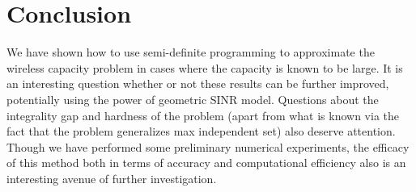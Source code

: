 \documentclass[11pt]{amsart}
\begin{document}
\section{Conclusion}
We have shown how to use semi-definite programming to approximate the wireless capacity problem in cases where the capacity is known to be large. It is an interesting question whether or not these results can be further improved, potentially using the power of geometric SINR model. Questions about the integrality gap and hardness of the problem (apart from what is known via the fact that the problem generalizes max independent set) also deserve attention. Though we have performed some preliminary numerical experiments, the efficacy of this method both in terms of accuracy and computational efficiency also is an interesting avenue of further investigation.


		
\end{document}
